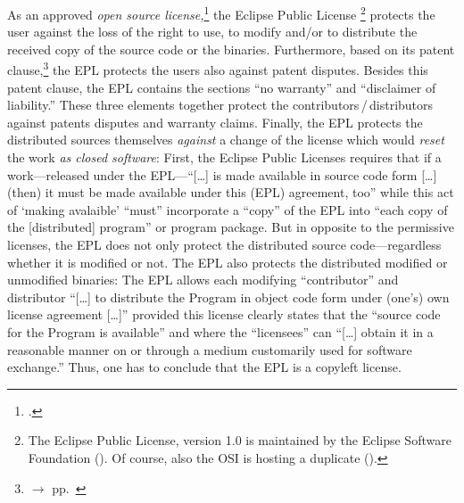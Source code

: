 As an approved \emph{open source license,}\footcite[cf.][\nopage wp]{OSI2012b}
the Eclipse Public License%
  \footnote{The Eclipse Public License, version 1.0 is maintained by the Eclipse
  Software Foundation (\cite[cf.][\nopage wp]{Epl10EclipseFoundation2005a}).
  Of course, also the OSI is hosting a duplicate (\cite[cf.][\nopage
  wp]{Epl10OsiLicense2005a}).} 
protects the user against the loss of the right to use, to modify and/or to
distribute the received copy of the source code or the binaries. 
Furthermore, based on its patent clause,\footnote{$\rightarrow$ \oslic{} 
pp.\ } the EPL protects the users also against
patent disputes. Besides this patent clause, the EPL contains the
sections \enquote{no warranty} and \enquote{disclaimer of
liability.} These three elements together protect the
contributors\,/\,distributors against patents disputes and warranty
claims. Finally, the EPL protects the distributed sources themselves
\emph{against} a change of the license which would \emph{reset} the work
\emph{as closed software}: First, the Eclipse Public Licenses requires that 
if a work---released under the EPL---\enquote{[\ldots] is made available in
source code form [\ldots] (then) it must be made available under this (EPL)
agreement, too} while this act of `making avalaible' \enquote{must} incorporate
a \enquote{copy} of the EPL into \enquote{each copy of the [distributed]
program} or program package. But in opposite to the permissive
licenses, the EPL does not only protect the distributed source code---regardless
whether it is modified or not. The EPL also protects the distributed modified or
unmodified binaries: The EPL allows each modifying \enquote{contributor} and
distributor \enquote{[\ldots] to distribute the Program in object code form
under (one's) own license agreement [\ldots]} provided this license clearly
states that the \enquote{source code for the Program is available} and where the
\enquote{licensees} can \enquote{[\ldots] obtain it in a reasonable manner on or
through a medium customarily used for software exchange.}
Thus, one has to conclude that the EPL is a copyleft license.

